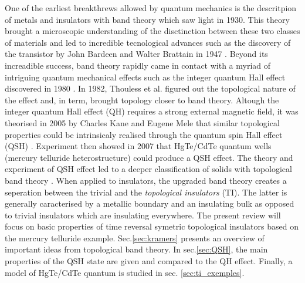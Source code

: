 One of the earliest breakthrews allowed by quantum mechanics is the descritpion of metals and insulators with band theory \cite{hoddeson_development_1987} which saw light in 1930. This theory brought a microscopic understanding of the disctinction between these two classes of materials and led to incredible tecnological advances such as the discovery of the transistor by John Bardeen and Walter Brattain in 1947 \cite{brinkman_history_1997}. Beyond its increadible success,  band theory rapidly came in contact with a myriad of intriguing quantum mechanical effects such as the integer quantum Hall effect discovered in 1980 \cite{klitzing_new_1980}. In 1982, Thouless et al. \cite{cayssol_topological_2021} figured out the topological nature of the effect and, in term, brought topology closer to band theory. Altough the integer quantum Hall effect (QH) requires a strong external magnetic field, it was theorised in 2005 by Charles Kane and Eugene Mele \cite{kane_quantum_2005} that similar topological properties could be intrinsicaly realised  through the quantum spin Hall effect (QSH) \cite{qi_quantum_2010}. Experiment then showed in 2007 \cite{koenig_quantum_2007} that HgTe/CdTe
quantum wells (mercury telluride heterostructure) could produce a QSH effect. The theory and experiment of QSH effect led to a deeper classification of solids with topological band theory \cite{soluyanov_topological_nodate}. When applied to insulators, the upgraded band theory creates a seperation between the trivial and the \textit{topological insulators} (TI). The latter is generally caracterised by a metallic boundary and an insulating bulk \cite{moore_birth_2010} as opposed to trivial insulators which are insulating everywhere. The present review will focus on basic properties of time reversal symetric topological insulators based on the mercury telluride example. Sec.\ref{sec:kramers} presents an overview of important ideas from topological band theory. In sec.\ref{sec:QSH}, the main properties of the QSH state are given and compared to the QH effect. Finally, a model of HgTe/CdTe
quantum is studied in sec. \ref{sec:ti_exemples}. 